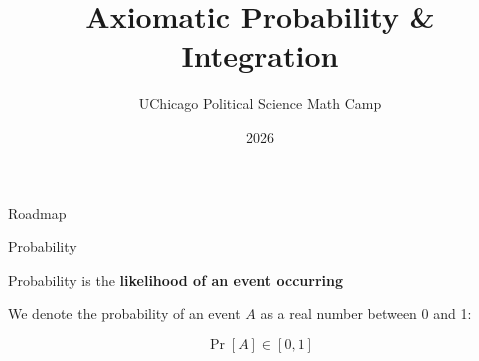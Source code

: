 \documentclass[10pt]{beamer}
\title{Axiomatic Probability \& Integration}
\author{UChicago Political Science Math Camp}
\institute{Ryan Gibbons \& Luke Cain}
\date{2026}
\begin{document}
\frame{\titlepage}


\begin{frame}{Roadmap}

\end{frame}

\begin{frame}{}

\end{frame}


\begin{frame}{}

\end{frame}

%
%
%
%
%


\begin{frame}{Probability}

Probability is the \textbf{likelihood of an event occurring} \\

\vspace{1cm}

We denote the probability of an event $A$ as a real number between 0 and 1:

\[\Pr[A] \in [0,1]\]

\end{frame}
\end{document}
